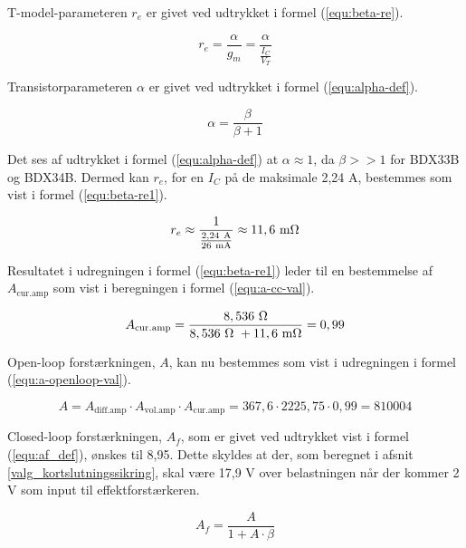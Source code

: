 T-model-parameteren $r_e$ er givet ved udtrykket i formel (\ref{equ:beta-re}).

\begin{equation}
\label{equ:beta-re}
r_e = \frac{\alpha}{g_m} = \frac{\alpha}{\frac{I_C}{V_T}}
\end{equation}

Transistorparameteren $\alpha$ er givet ved udtrykket i formel (\ref{equ:alpha-def}).

\begin{equation}
\label{equ:alpha-def}
\alpha = \frac{\beta}{\beta + 1}
\end{equation}

Det ses af udtrykket i formel (\ref{equ:alpha-def}) at $\alpha \approx 1$, da $\beta>>1$ for BDX33B og BDX34B. Dermed kan $r_e$, for en $I_C$ på de maksimale 2,24 A, bestemmes som vist i formel (\ref{equ:beta-re1}).

\begin{equation}
\label{equ:beta-re1}
r_e \approx \frac{1}{\frac{\mathrm{2,24~A}}{\mathrm{26~mA}}} \approx \mathrm{11,6~m\ohm}
\end{equation}

Resultatet i udregningen i formel (\ref{equ:beta-re1}) leder til en bestemmelse af $A_\mathrm{cur.amp}$ som vist i beregningen i formel (\ref{equ:a-cc-val}).

\begin{equation}
\label{equ:a-cc-val}
A_\mathrm{cur.amp} = \frac{\mathrm{8,536~\ohm}}{\mathrm{8,536~\ohm~} + \mathrm{11,6~m\ohm}} = 0,99
\end{equation}

Open-loop forstærkningen, $A$, kan nu bestemmes som vist i udregningen i formel (\ref{equ:a-openloop-val}).

\begin{equation}
\label{equ:a-openloop-val}
A = A_\mathrm{diff.amp} \cdot A_\mathrm{vol.amp} \cdot A_\mathrm{cur.amp} = 367,6 \cdot 2225,75 \cdot 0,99 = 810004
\end{equation}

Closed-loop forstærkningen, $A_f$, som er givet ved udtrykket vist i formel (\ref{equ:af_def}), ønskes til 8,95. Dette skyldes at der, som beregnet i afsnit \ref{valg_kortslutningssikring}, skal være 17,9 V over belastningen når der kommer 2 V som input til effektforstærkeren.

\begin{equation}
\label{equ:af_def}
A_f = \frac{A}{1 + A \cdot \beta}
\end{equation}

